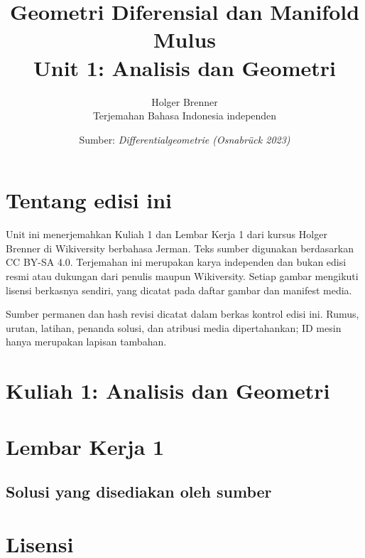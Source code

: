 \documentclass[11pt,a4paper,oneside]{book}
\title{Geometri Diferensial dan Manifold Mulus\\\large Unit 1: Analisis dan Geometri}
\author{Holger Brenner\\Terjemahan Bahasa Indonesia independen}
\date{Sumber: \textit{Differentialgeometrie (Osnabrück 2023)}}
\begin{document}
\hypersetup{pageanchor=false}
\maketitle
\hypersetup{pageanchor=true}
\frontmatter
\chapter*{Tentang edisi ini}
Unit ini menerjemahkan Kuliah 1 dan Lembar Kerja 1 dari kursus Holger Brenner di Wikiversity berbahasa Jerman. Teks sumber digunakan berdasarkan CC BY-SA 4.0. Terjemahan ini merupakan karya independen dan bukan edisi resmi atau dukungan dari penulis maupun Wikiversity. Setiap gambar mengikuti lisensi berkasnya sendiri, yang dicatat pada daftar gambar dan manifest media.

Sumber permanen dan hash revisi dicatat dalam berkas kontrol edisi ini. Rumus, urutan, latihan, penanda solusi, dan atribusi media dipertahankan; ID mesin hanya merupakan lapisan tambahan.
\tableofcontents

\mainmatter
\chapter{Kuliah 1: Analisis dan Geometri}


\chapter{Lembar Kerja 1}


\section*{Solusi yang disediakan oleh sumber}


\backmatter
\listoffigures

\chapter*{Lisensi}
\Lizenztext
\end{document}
